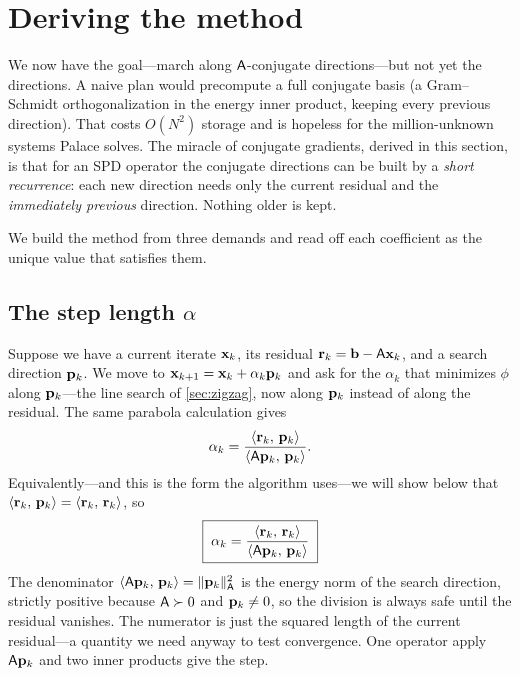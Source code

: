 \section{Deriving the method}
\label{sec:derive}

We now have the goal---march along $\mathsf{A}$-conjugate directions---but not yet
the directions. A naive plan would precompute a full conjugate basis (a
Gram--Schmidt orthogonalization in the energy inner product, keeping every
previous direction). That costs $O(N^2)$ storage and is hopeless for the
million-unknown systems Palace solves. The miracle of conjugate gradients,
derived in this section, is that for an SPD operator the conjugate directions can
be built by a \emph{short recurrence}: each new direction needs only the current
residual and the \emph{immediately previous} direction. Nothing older is kept.

We build the method from three demands and read off each coefficient as the
unique value that satisfies them.

\subsection{The step length \texorpdfstring{$\alpha$}{alpha}}
\label{sec:alpha}

Suppose we have a current iterate $\mathbf{x}_k$, its residual $\mathbf{r}_k=\mathbf{b}-\mathsf{A}\mathbf{x}_k$,
and a search direction $\mathbf{p}_k$. We move to $\mathbf{x}_{k+1}=\mathbf{x}_k+\alpha_k\mathbf{p}_k$ and ask
for the $\alpha_k$ that minimizes $\phi$ along $\mathbf{p}_k$---the line search of
\cref{sec:zigzag}, now along $\mathbf{p}_k$ instead of along the residual. The same
parabola calculation gives
\begin{equation}
\label{eq:alpha}
  \alpha_k = \frac{\left\langle \mathbf{r}_k,\, \mathbf{p}_k\right\rangle}{\left\langle \mathsf{A}\mathbf{p}_k,\, \mathbf{p}_k\right\rangle} .
\end{equation}
Equivalently---and this is the form the algorithm uses---we will show below that
$\left\langle \mathbf{r}_k,\, \mathbf{p}_k\right\rangle=\left\langle \mathbf{r}_k,\, \mathbf{r}_k\right\rangle$, so
\begin{equation}
\label{eq:alpha2}
  \boxed{\;\alpha_k = \frac{\left\langle \mathbf{r}_k,\, \mathbf{r}_k\right\rangle}{\left\langle \mathsf{A}\mathbf{p}_k,\, \mathbf{p}_k\right\rangle}\;}
\end{equation}
The denominator $\left\langle \mathsf{A}\mathbf{p}_k,\, \mathbf{p}_k\right\rangle=\lVert\mathbf{p}_k\rVert_{\mathsf{A}}^2$ is the
energy norm of the search direction, strictly positive because $\mathsf{A}\succ0$ and
$\mathbf{p}_k\neq0$, so the division is always safe until the residual vanishes.
The numerator is just the squared length of the current residual---a quantity we
need anyway to test convergence. One operator apply $\mathsf{A}\mathbf{p}_k$ and two inner
products give the step.

